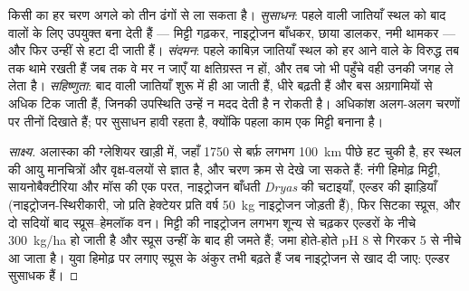 \begin{proposition}[प्रतिस्थापन की क्रियाविधियाँ]\label{prop:b1:ecosystem-dynamics:mechanisms}
किसी  का हर चरण अगले को तीन ढंगों से ला सकता है।
\emph{सुसाधन}: पहले वाली जातियाँ स्थल को बाद वालों के लिए उपयुक्त बना
देती हैं --- मिट्टी गढ़कर, नाइट्रोजन बाँधकर, छाया डालकर, नमी थामकर ---
और फिर उन्हीं से हटा दी जाती हैं। \emph{संदमन}: पहले काबिज़ जातियाँ स्थल
को हर आने वाले के विरुद्ध तब तक थामे रखती हैं जब तक वे मर न जाएँ या
क्षतिग्रस्त न हों, और तब जो भी पहुँचे वही उनकी जगह ले लेता है।
\emph{सहिष्णुता}: बाद वाली जातियाँ शुरू में ही आ जाती हैं, धीरे बढ़ती हैं
और बस अग्रगामियों से अधिक टिक जाती हैं, जिनकी उपस्थिति उन्हें न मदद देती
है न रोकती है। अधिकांश  अलग-अलग चरणों पर तीनों दिखाते हैं;
 पर सुसाधन हावी रहता है, क्योंकि पहला काम एक मिट्टी
बनाना है।
\end{proposition}
\begin{proof}[साक्ष्य]
अलास्का की ग्लेशियर खाड़ी में, जहाँ 1750 से बर्फ़ लगभग
\qty{100}{km} पीछे हट चुकी है, हर स्थल की आयु मानचित्रों और वृक्ष-वलयों
से ज्ञात है, और चरण क्रम से देखे जा सकते हैं: नंगी हिमोढ़ मिट्टी,
सायनोबैक्टीरिया और मॉस की एक परत, नाइट्रोजन बाँधती \emph{Dryas} की
चटाइयाँ, एल्डर की झाड़ियाँ (नाइट्रोजन-स्थिरीकारी, जो प्रति हेक्टेयर प्रति
वर्ष \qty{50}{kg} नाइट्रोजन जोड़ती हैं), फिर सिटका स्प्रूस, और दो सदियों
बाद स्प्रूस--हेमलॉक वन। मिट्टी की नाइट्रोजन लगभग शून्य से चढ़कर एल्डरों
के नीचे \qty{300}{kg/ha} हो जाती है और स्प्रूस उन्हीं के बाद ही जमते हैं;
 जमा होते-होते pH 8 से गिरकर 5 से नीचे आ जाता है। युवा हिमोढ़ पर
लगाए स्प्रूस के अंकुर तभी बढ़ते हैं जब नाइट्रोजन से खाद दी जाए: एल्डर
सुसाधक हैं।
\end{proof}


